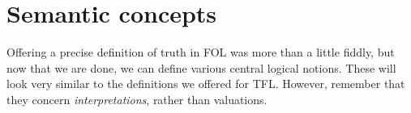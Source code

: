 \chapter{Semantic concepts}

Offering a precise definition of truth in FOL was more than a little fiddly, but now that we are done, we can define various central logical notions. These will look very similar to the definitions we offered for TFL. However, remember that they concern \emph{interpretations}, rather than valuations.


